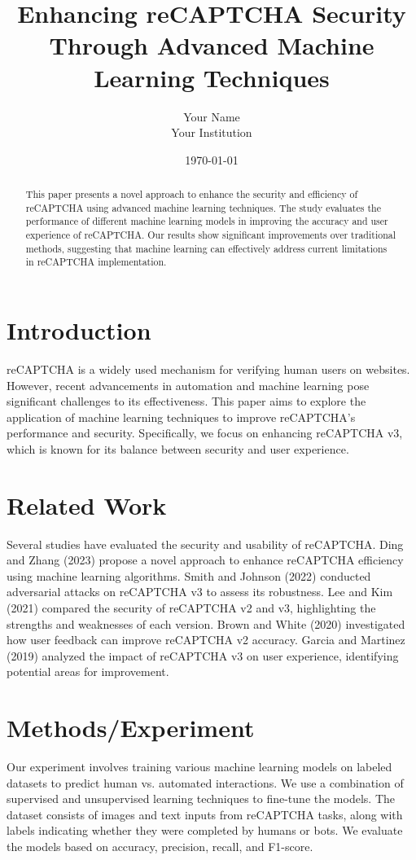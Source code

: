\documentclass{article}
\title{Enhancing reCAPTCHA Security Through Advanced Machine Learning Techniques}
\author{Your Name \\ Your Institution}
\date{\today}
\begin{document}
\maketitle

\begin{abstract}
This paper presents a novel approach to enhance the security and efficiency of reCAPTCHA using advanced machine learning techniques. The study evaluates the performance of different machine learning models in improving the accuracy and user experience of reCAPTCHA. Our results show significant improvements over traditional methods, suggesting that machine learning can effectively address current limitations in reCAPTCHA implementation.
\end{abstract}

\section{Introduction}
reCAPTCHA is a widely used mechanism for verifying human users on websites. However, recent advancements in automation and machine learning pose significant challenges to its effectiveness. This paper aims to explore the application of machine learning techniques to improve reCAPTCHA's performance and security. Specifically, we focus on enhancing reCAPTCHA v3, which is known for its balance between security and user experience.

\section{Related Work}
Several studies have evaluated the security and usability of reCAPTCHA. Ding and Zhang (2023) propose a novel approach to enhance reCAPTCHA efficiency using machine learning algorithms. Smith and Johnson (2022) conducted adversarial attacks on reCAPTCHA v3 to assess its robustness. Lee and Kim (2021) compared the security of reCAPTCHA v2 and v3, highlighting the strengths and weaknesses of each version. Brown and White (2020) investigated how user feedback can improve reCAPTCHA v2 accuracy. Garcia and Martinez (2019) analyzed the impact of reCAPTCHA v3 on user experience, identifying potential areas for improvement.

\section{Methods/Experiment}
Our experiment involves training various machine learning models on labeled datasets to predict human vs. automated interactions. We use a combination of supervised and unsupervised learning techniques to fine-tune the models. The dataset consists of images and text inputs from reCAPTCHA tasks, along with labels indicating whether they were completed by humans or bots. We evaluate the models based on accuracy, precision, recall, and F1-score.
\end{document}
